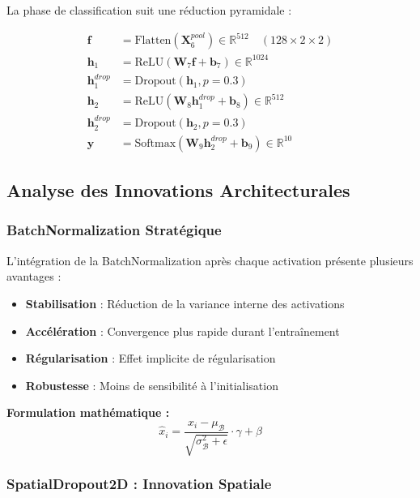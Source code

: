 \documentclass[12pt,a4paper]{article}
\begin{document}
La phase de classification suit une réduction pyramidale :

\begin{align}
\mathbf{f} &= \text{Flatten}(\mathbf{X}_6^{pool}) \in \mathbb{R}^{512} \quad (128 \times 2 \times 2) \\
\mathbf{h}_1 &= \text{ReLU}(\mathbf{W}_7 \mathbf{f} + \mathbf{b}_7) \in \mathbb{R}^{1024} \\
\mathbf{h}_1^{drop} &= \text{Dropout}(\mathbf{h}_1, p=0.3) \\
\mathbf{h}_2 &= \text{ReLU}(\mathbf{W}_8 \mathbf{h}_1^{drop} + \mathbf{b}_8) \in \mathbb{R}^{512} \\
\mathbf{h}_2^{drop} &= \text{Dropout}(\mathbf{h}_2, p=0.3) \\
\mathbf{y} &= \text{Softmax}(\mathbf{W}_9 \mathbf{h}_2^{drop} + \mathbf{b}_9) \in \mathbb{R}^{10}
\end{align}

\subsection{Analyse des Innovations Architecturales}

\subsubsection{BatchNormalization Stratégique}

L'intégration de la BatchNormalization après chaque activation présente plusieurs avantages :

\begin{itemize}
    \item \textbf{Stabilisation} : Réduction de la variance interne des activations
    \item \textbf{Accélération} : Convergence plus rapide durant l'entraînement
    \item \textbf{Régularisation} : Effet implicite de régularisation
    \item \textbf{Robustesse} : Moins de sensibilité à l'initialisation
\end{itemize}

\textbf{Formulation mathématique :}
$$\hat{x}_i = \frac{x_i - \mu_{\mathcal{B}}}{\sqrt{\sigma_{\mathcal{B}}^2 + \epsilon}} \cdot \gamma + \beta$$

\subsubsection{SpatialDropout2D : Innovation Spatiale}
\end{document}
